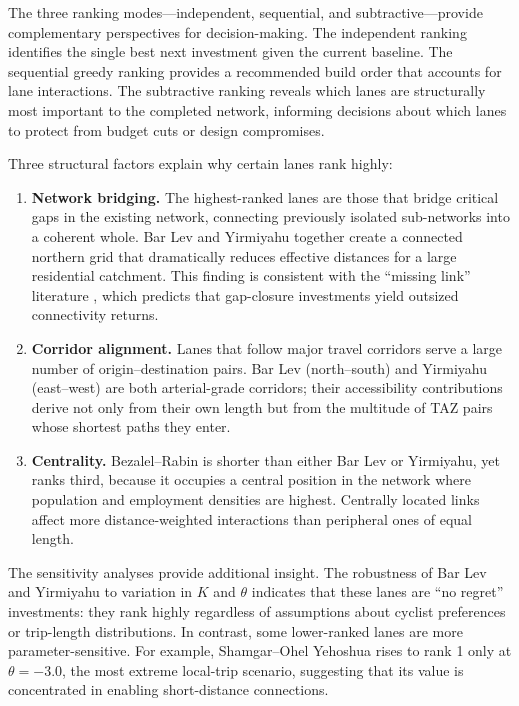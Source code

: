 \documentclass[12pt,a4paper]{article}
\begin{document}
The three ranking modes---independent, sequential, and subtractive---provide complementary perspectives for decision-making. The independent ranking identifies the single best next investment given the current baseline. The sequential greedy ranking provides a recommended build order that accounts for lane interactions. The subtractive ranking reveals which lanes are structurally most important to the completed network, informing decisions about which lanes to protect from budget cuts or design compromises.

Three structural factors explain why certain lanes rank highly:

\begin{enumerate}[leftmargin=*]
    \item \textbf{Network bridging.} The highest-ranked lanes are those that bridge critical gaps in the existing network, connecting previously isolated sub-networks into a coherent whole. Bar Lev and Yirmiyahu together create a connected northern grid that dramatically reduces effective distances for a large residential catchment. This finding is consistent with the ``missing link'' literature \citep{schoner2014missing,furth2016network}, which predicts that gap-closure investments yield outsized connectivity returns.

    \item \textbf{Corridor alignment.} Lanes that follow major travel corridors serve a large number of origin--destination pairs. Bar Lev (north--south) and Yirmiyahu (east--west) are both arterial-grade corridors; their accessibility contributions derive not only from their own length but from the multitude of TAZ pairs whose shortest paths they enter.

    \item \textbf{Centrality.} Bezalel--Rabin is shorter than either Bar Lev or Yirmiyahu, yet ranks third, because it occupies a central position in the network where population and employment densities are highest. Centrally located links affect more distance-weighted interactions than peripheral ones of equal length.
\end{enumerate}

The sensitivity analyses provide additional insight. The robustness of Bar Lev and Yirmiyahu to variation in $K$ and $\theta$ indicates that these lanes are ``no regret'' investments: they rank highly regardless of assumptions about cyclist preferences or trip-length distributions. In contrast, some lower-ranked lanes are more parameter-sensitive. For example, Shamgar--Ohel Yehoshua rises to rank 1 only at $\theta = -3.0$, the most extreme local-trip scenario, suggesting that its value is concentrated in enabling short-distance connections.
\end{document}
